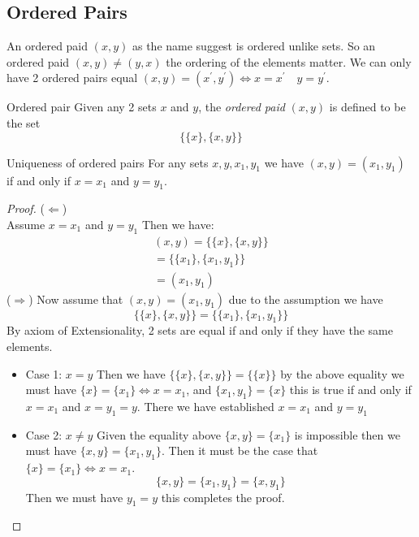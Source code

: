\documentclass[16pt,a4paper]{article}
\theoremstyle{definition}
\begin{document}
\subsection{Ordered Pairs}
An ordered paid $(x,y)$ as the name suggest is ordered unlike sets. So an ordered paid $(x,y) \neq (y,x)$ the ordering of the elements matter. We can only have 2 ordered pairs equal $(x,y) = (x^\prime, y^\prime) \iff x = x^\prime\quad y = y^\prime$. \\
\begin{defn}{Ordered pair}{}
Given any 2 sets $x$ and $y$, the \textit{ordered paid} $(x,y)$ is defined to be the set \[\{\{x\}, \{x,y\}\}\]
\end{defn}\newpage
\begin{thm}{Uniqueness of ordered pairs}{}
For any sets $x,y,x_1, y_1$ we have $(x,y) = (x_1, y_1)$ if and only if $x = x_1$ and $y = y_1$. 
\end{thm}
\begin{proof}
($\Leftarrow$)\\
Assume $x = x_1$ and $y = y_1$
Then we have:
\begin{align*}
(x,y) = \{\{x\}, \{x,y\}\}\\
= \{\{x_1\}, \{x_1,y_1\}\}\\
= (x_1, y_1)
\end{align*}
($\Rightarrow$)
Now assume that $(x,y) = (x_1, y_1)$ due to the assumption we have
\[\{\{x\}, \{x,y\}\} = \{\{x_1\}, \{x_1,y_1\}\}\]
By axiom of Extensionality, 2 sets are equal if and only if they have the same elements. 
\begin{itemize}
\item Case 1: $x = y$
Then we have $\{\{x\}, \{x,y\}\} =  \{\{x\}\}$ by the above equality we must have $\{x\} = \{x_1\} \iff x = x_1$, and $\{x_1, y_1\} = \{x\}$ this is true if and only if $x = x_1$ and $x = y_1  = y$. There we have established $x = x_1$ and $y = y_1$
\item Case 2: $x \neq y$
Given the equality above $\{x,y\} = \{x_1\}$ is impossible then we must have $\{x,y\} = \{x_1, y_1\}$. Then it must be the case that $\{x\} = \{x_1\} \iff x = x_1$. 
\[\{x,y\} = \{x_1, y_1\} = \{x,y_1\}\]
Then we must have $y_1 = y$ this completes the proof. 
\end{itemize}
\end{proof}


\newpage
\end{document}
